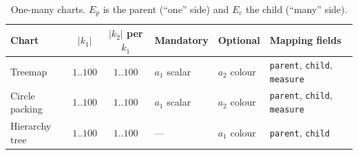 \begin{table}[htbp]
\centering
\caption{One-many charts. $E_p$ is the parent (``one'' side) and $E_c$ the child (``many'' side).}
\label{tab:step2-onemany}
\small
\renewcommand{\arraystretch}{1.25}
\begin{tabular}{@{}lcclll@{}}
\toprule
\textbf{Chart} & \textbf{$|k_1|$} & \textbf{$|k_2|$ per $k_1$} & \textbf{Mandatory} & \textbf{Optional} & \textbf{Mapping fields} \\
\midrule
Treemap & $1..100$ & $1..100$ & $a_1$ scalar & $a_2$ colour & \texttt{parent}, \texttt{child}, \texttt{measure} \\
Circle packing & $1..100$ & $1..100$ & $a_1$ scalar & $a_2$ colour & \texttt{parent}, \texttt{child}, \texttt{measure} \\
Hierarchy tree & $1..100$ & $1..100$ & --- & $a_1$ colour & \texttt{parent}, \texttt{child} \\
\bottomrule
\end{tabular}
\end{table}

